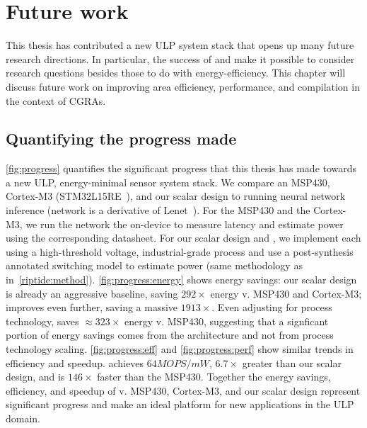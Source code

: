 \chapter{Future work}
\label{chapter:future}
This thesis has contributed a new ULP system stack that opens up many future research directions.
% 
In particular, the success of \snafu and \riptide make it possible to consider research questions besides those to do with energy-efficiency.
% 
This chapter will discuss future work on improving area efficiency, performance, and compilation in the context of CGRAs.

\figProgress
\section{Quantifying the progress made}
\autoref{fig:progress} quantifies the significant progress that this thesis has made towards a new ULP, energy-minimal sensor system stack.
%
We compare an MSP430, Cortex-M3 (STM32L15RE~\cite{stm32l1}), and our scalar design to \riptide running neural network inference (network is a derivative of Lenet~\cite{lecun:ieee89:lenet}).
% 
For the MSP430 and the Cortex-M3, we run the network the on-device to measure latency and estimate power using the corresponding datasheet. 
% 
For our scalar design and \riptide, we implement each using a high-threshold voltage, industrial-grade process and use a post-synthesis annotated switching model to estimate power (same methodology as in~\autoref{riptide:method}).
% 
\autoref{fig:progress:energy} shows energy savings: our scalar design is already an aggressive baseline, saving $292\times$ energy v. MSP430 and Cortex-M3; \riptide improves even further, saving a massive $1913\times$.
% 
Even adjusting for process technology, \riptide saves $\approx 323 \times$ energy v. MSP430, suggesting that a signficant portion of energy savings comes from the architecture and not from process technology scaling.
% 
\autoref{fig:progress:eff} and \autoref{fig:progress:perf} show similar trends in efficiency and speedup.
% 
\riptide achieves $64MOPS/mW$, $6.7\times$ greater than our scalar design, and 
is $146\times$ faster than the MSP430.
% 
Together the energy savings, efficiency, and speedup of \riptide v. MSP430, Cortex-M3, and our scalar design represent significant progress and make \riptide an ideal platform for new applications in the ULP domain.

\figFutureModel
